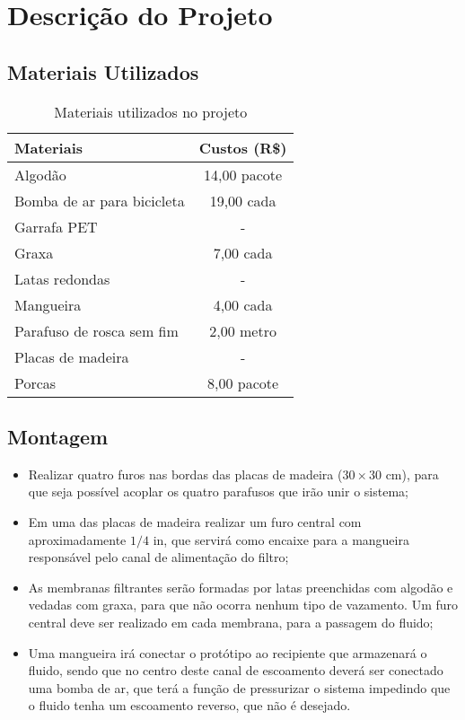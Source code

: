 \chapter{Descrição do Projeto}\label{descricao}

\section{Materiais Utilizados}

\begin{table}[H]
\centering
\caption{Materiais utilizados no projeto}
\label{tab:materiais}
\begin{tabular}{lc}
\textbf{Materiais}         & \multicolumn{1}{l}{\textbf{Custos (R\$)}} \\ \toprule
Algodão                    &      14,00 pacote                   \\
Bomba de ar para bicicleta &      19,00 cada                     \\
Garrafa PET                & -                                   \\
Graxa                      &       7,00 cada                     \\
Latas redondas             & -                                   \\
Mangueira                  &       4,00 cada                     \\
Parafuso de rosca sem fim  &       2,00 metro                    \\
Placas de madeira          & -                                   \\
  Porcas                   &       8,00 pacote                   \\ \bottomrule
\end{tabular}
\end{table}

\section{Montagem}
\label{sec:montagem}

\begin{itemize}
\item Realizar quatro furos nas bordas das placas de madeira ($30\times30$ \si{cm}),
  para que seja possível acoplar os quatro parafusos que irão unir o sistema;
\item Em uma das placas de madeira realizar um furo central com aproximadamente
  $1/4$ \si{in}, que servirá como encaixe para a mangueira responsável pelo canal de
  alimentação do filtro;
\item As membranas filtrantes serão formadas por latas preenchidas com algodão e
  vedadas com graxa, para que não ocorra nenhum tipo de vazamento. Um furo
  central deve ser realizado em cada membrana, para a passagem do fluido;
\item Uma mangueira irá conectar o protótipo ao recipiente que armazenará o
  fluido, sendo que no centro deste canal de escoamento deverá ser conectado
  uma bomba de ar, que terá a função de pressurizar o sistema impedindo que o
  fluido tenha um escoamento reverso, que não é desejado.
\end{itemize}

